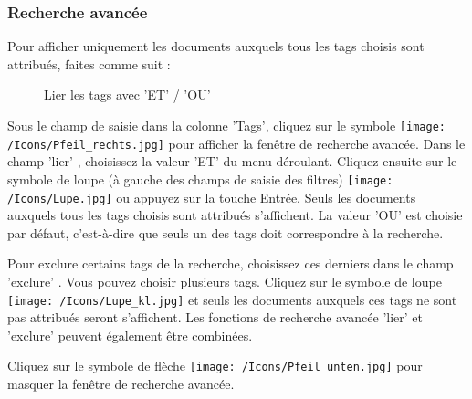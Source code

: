 \vspace{\baselineskip}

\subsubsection{Recherche avancée}

Pour afficher uniquement les documents auxquels tous les tags choisis sont attribués, faites comme suit :

\begin{figure}[H]
\caption{Lier les tags avec 'ET' / 'OU'}
\end{figure}

Sous le champ de saisie dans la colonne 'Tags', cliquez sur le symbole \texttt{[image: /Icons/Pfeil\_rechts.jpg]}  pour afficher la fenêtre de recherche avancée. Dans le champ 'lier' , choisissez la valeur 'ET'  du menu déroulant. Cliquez ensuite sur le symbole de loupe (à gauche des champs de saisie des filtres) \texttt{[image: /Icons/Lupe.jpg]}  ou appuyez sur la touche Entrée. Seuls les documents auxquels tous les tags choisis sont attribués s'affichent. La valeur 'OU' est choisie par défaut, c'est-à-dire que seuls un des tags doit correspondre à la recherche.\newline

Pour exclure certains tags de la recherche, choisissez ces derniers dans le champ 'exclure' . Vous pouvez choisir plusieurs tags. Cliquez sur le symbole de loupe \texttt{[image: /Icons/Lupe\_kl.jpg]} et seuls les documents auxquels ces tags ne sont pas attribués seront s'affichent. Les fonctions de recherche avancée 'lier' et 'exclure' peuvent également être combinées.

\vspace{\baselineskip}

Cliquez sur le symbole de flèche \texttt{[image: /Icons/Pfeil\_unten.jpg]}  pour masquer la fenêtre de recherche avancée.

